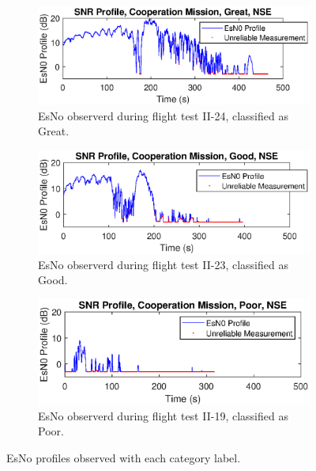 \begin{figure}[ht!]
\centering
\begin{subfigure}{\linewidth}
\centering
\includegraphics{figures/flight_results/coop_great_nse_esno.eps}
\caption{EsNo observerd during flight test II-24, classified as Great.}
\end{subfigure}
\begin{subfigure}{\linewidth}
\centering
\includegraphics{figures/flight_results/coop_good_nse_esno.eps}
\caption{EsNo observerd during flight test II-23, classified as Good.}
\end{subfigure}
\begin{subfigure}{\linewidth}
\centering
\includegraphics{figures/flight_results/coop_poor_nse_esno.eps}
\caption{EsNo observerd during flight test II-19, classified as Poor.}
\end{subfigure}

\caption{EsNo profiles observed with each category label.} \label{fig:snrProfileVarieties_flight}
\end{figure} 


